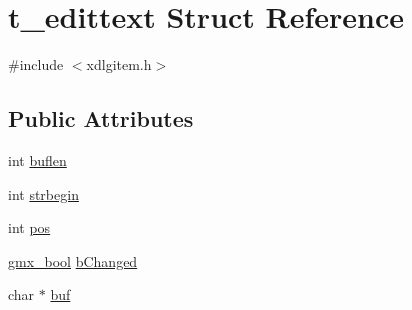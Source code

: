 \hypertarget{structt__edittext}{\section{t\-\_\-edittext \-Struct \-Reference}
\label{structt__edittext}
}


{\ttfamily \#include $<$xdlgitem.\-h$>$}

\subsection*{\-Public \-Attributes}
\begin{DoxyCompactItemize}
\item 
int \hyperlink{structt__edittext_af63d870207de88fbea4cefe2442d8de0}{buflen}
\item 
int \hyperlink{structt__edittext_a81a5e5ba947592b6e04c7248de8dd8c4}{strbegin}
\item 
int \hyperlink{structt__edittext_ae20655a256890fd9f1e23460d5c8a0c6}{pos}
\item 
\hyperlink{include_2types_2simple_8h_a8fddad319f226e856400d190198d5151}{gmx\-\_\-bool} \hyperlink{structt__edittext_a036203e51a9907a4dc242446dea646c0}{b\-Changed}
\item 
char $\ast$ \hyperlink{structt__edittext_a44635714ddc548cbfb2a7929d59f3164}{buf}
\end{DoxyCompactItemize}



